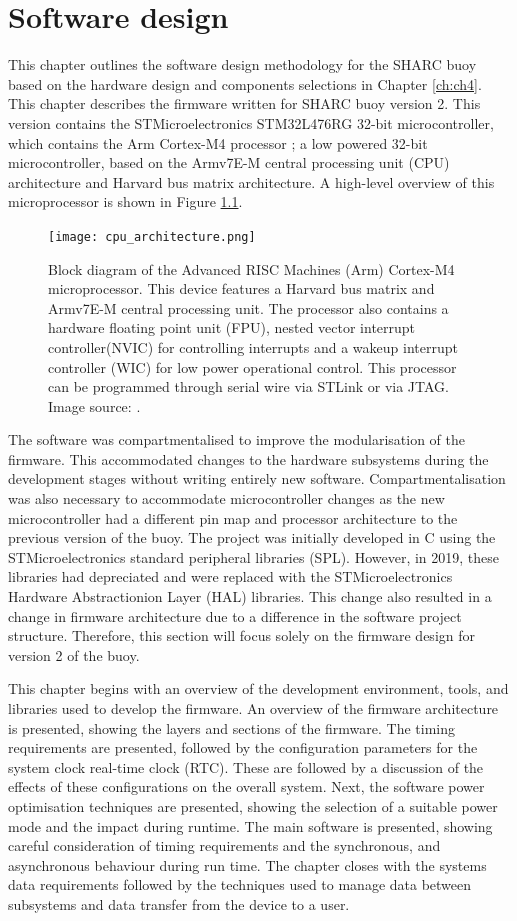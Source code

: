 \chapter{Software design}
\label{ch:ch5}
This chapter outlines the software design methodology for the SHARC buoy based on the hardware design and components selections in Chapter \ref{ch:ch4}. This chapter describes the firmware written for SHARC buoy version 2. This version contains the STMicroelectronics STM32L476RG 32-bit microcontroller, \cite{stm32l4} which contains the Arm Cortex-M4 processor \cite{ARMprocessor}; a low powered 32-bit microcontroller, based on the Armv7E-M central processing unit (CPU) architecture and Harvard bus matrix architecture. A high-level overview of this microprocessor is shown in Figure \ref{fig:cpu}.

\begin{figure}[H]
	\centering
	\texttt{[image: cpu\_architecture.png]}
	\caption{Block diagram of the Advanced RISC Machines (Arm) Cortex-M4 microprocessor. This device features a Harvard bus matrix and Armv7E-M central processing unit. The processor also contains a hardware floating point unit (FPU), nested vector interrupt controller(NVIC) for controlling interrupts and a wakeup interrupt controller (WIC) for low power operational control. This processor can be programmed through serial wire via STLink or via JTAG. Image source: \cite{ARMprocessor}. }
	\label{fig:cpu}
\end{figure}

The software was compartmentalised to improve the modularisation of the firmware. This accommodated changes to the hardware subsystems during the development stages without writing entirely new software. Compartmentalisation was also necessary to accommodate microcontroller changes as the new microcontroller had a different pin map and processor architecture to the previous version of the buoy. The project was initially developed in C using the STMicroelectronics standard peripheral libraries (SPL). However, in 2019, these libraries had depreciated and were replaced with the STMicroelectronics Hardware Abstractionion Layer (HAL) libraries. This change also resulted in a change in firmware architecture due to a difference in the software project structure. Therefore, this section will focus solely on the firmware design for version 2 of the buoy.

This chapter begins with an overview of the development environment, tools, and libraries used to develop the firmware. An overview of the firmware architecture is presented, showing the layers and sections of the firmware. The timing requirements are presented, followed by the configuration parameters for the system clock real-time clock (RTC). These are followed by a discussion of the effects of these configurations on the overall system. Next, the software power optimisation techniques are presented, showing the selection of a suitable power mode and the impact during runtime. The main software is presented, showing careful consideration of timing requirements and the synchronous, and asynchronous behaviour during run time. The chapter closes with the systems data requirements followed by the techniques used to manage data between subsystems and data transfer from the device to a user.

